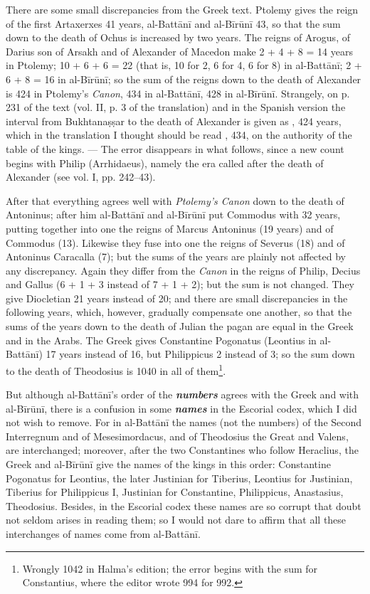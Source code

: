 \documentclass[11pt]{article}
\newcommand{\Pg}[1]{\marginpar{\footnotesize\color{gray}#1}}
\begin{document}
\par There are some small discrepancies from the Greek text. Ptolemy gives the reign of the first Artaxerxes 41 years, al-Battānī and al-Bīrūnī 43, so that the sum down to the death of Ochus is increased by two years. The reigns of Arogus, of Darius son of Arsakh and of Alexander of Macedon make 2 + 4 + 8 = 14 years in Ptolemy; 10 + 6 + 6 = 22 (that is,  10 for  2,  6 for  4,  6 for  8) in al-Battānī; 2 + 6 + 8 = 16 in al-Bīrūnī; so the sum of the reigns down to the death of Alexander is 424 in Ptolemy's \emph{Canon}, 434 in al-Battānī, 428 in al-Bīrūnī. Strangely, on p. 231 of the text (vol. II, p. 3 of the translation) and in the Spanish version the interval from Bukhtanaṣṣar to the death of Alexander is given as , 424 years, which in the translation I thought should be read , 434, on the authority of the table of the kings. — The error disappears in what follows, since a new count begins with Philip (Arrhidaeus), namely the era called after the death of Alexander (see vol. I, pp. 242–43).\par
\par After that everything agrees well with \emph{Ptolemy's Canon} down to the death of Antoninus; after him al-Battānī and al-Bīrūnī put Commodus with 32 years, putting together into one the reigns of Marcus Antoninus (19 years) and of Commodus (13). Likewise they fuse into one the reigns of Severus (18) and of Antoninus Caracalla (7); but the sums of the years are plainly not affected by any discrepancy. Again they differ from the \emph{Canon} in the reigns of Philip, Decius and Gallus (6 + 1 + 3 instead of 7 + 1 + 2); but the sum is not changed. They give Diocletian 21 years instead of 20; and there are small discrepancies in the following years, which, however, gradually compensate one another, so that the sums of the years down to the death of Julian the pagan are equal in the Greek and in the Arabs. The Greek gives Constantine Pogonatus (Leontius in al-Battānī) 17 years instead of 16, but Philippicus 2 instead of 3; so the sum down to the death of Theodosius is 1040 in all of them\footnote{Wrongly 1042 in Halma's edition; the error begins with the sum for Constantius, where the editor wrote 994 for 992.}.\par
\par \Pg{II 193}But although al-Battānī's order of the \emph{\textbf{numbers}} agrees with the Greek and with al-Bīrūnī, there is a confusion in some \emph{\textbf{names}} in the Escorial codex, which I did not wish to remove. For in al-Battānī the names (not the numbers) of the Second Interregnum and of Mesesimordacus, and of Theodosius the Great and Valens, are interchanged; moreover, after the two Constantines who follow Heraclius, the Greek and al-Bīrūnī give the names of the kings in this order: Constantine Pogonatus for Leontius, the later Justinian for Tiberius, Leontius for Justinian, Tiberius for Philippicus I, Justinian for Constantine, Philippicus, Anastasius, Theodosius. Besides, in the Escorial codex these names are so corrupt that doubt not seldom arises in reading them; so I would not dare to affirm that all these interchanges of names come from al-Battānī.\par
\end{document}
